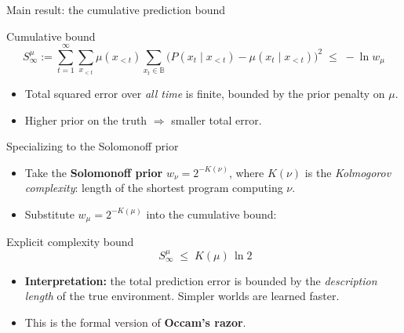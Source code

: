 \documentclass[10pt,aspectratio=169]{beamer}
\newcommand{\cM}{\mathcal{M}}
\newcommand{\B}{\mathbb{B}}
\begin{document}

\begin{frame}{Main result: the cumulative prediction bound}
\begin{block}{Cumulative bound}
\[
S_\infty^\mu := \sum_{t=1}^{\infty} \sum_{x_{<t}} \mu(x_{<t})
    \sum_{x_t \in \B} \big( P(x_t \mid x_{<t}) - \mu(x_t \mid x_{<t}) \big)^2
\;\leq\; -\ln w_\mu
\]
\end{block}
\begin{itemize}
    \item Total squared error over \emph{all time} is finite, bounded by the prior penalty on $\mu$.
    \item Higher prior on the truth $\Rightarrow$ smaller total error.
\end{itemize}
\end{frame}

\begin{frame}{Specializing to the Solomonoff prior}
\begin{itemize}
    \item Take the \textbf{Solomonoff prior} $w_\nu = 2^{-K(\nu)}$, where $K(\nu)$ is the
    \emph{Kolmogorov complexity}: length of the shortest program computing $\nu$.
    \pause
    \item Substitute $w_\mu = 2^{-K(\mu)}$ into the cumulative bound:
\end{itemize}
\begin{block}{Explicit complexity bound}
\[
\; S^\mu_\infty \;\leq\; K(\mu)\,\ln 2 
\]
\end{block}
\pause
\begin{itemize}
    \item \textbf{Interpretation:} the total prediction error is bounded by the
    \emph{description length} of the true environment. Simpler worlds are learned faster.
    \item This is the formal version of \textbf{Occam's razor}.
\end{itemize}
\end{frame}
\end{document}
